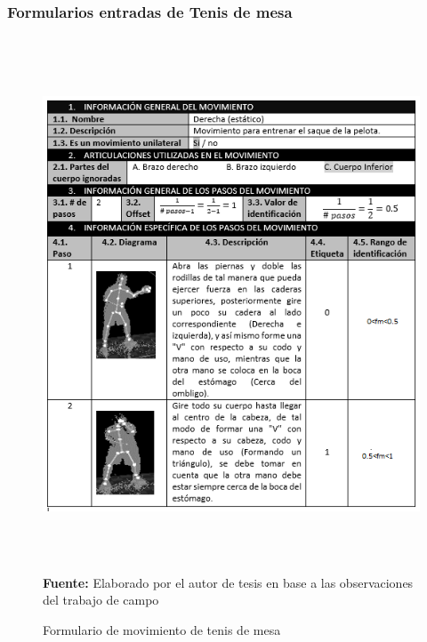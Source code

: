 \subsubsection{Formularios entradas de Tenis de mesa}
\begin{figure}[H]
	\caption{Formulario de movimiento de tenis de mesa}
	\label{fig:frmMovTen}
	\centering	\includegraphics[width=445px,height=600px]{graphics/resultados/movimientoTenis.PNG} \\
	\textbf{Fuente:} Elaborado por el autor de tesis en base a las observaciones del trabajo de campo
\end{figure}
